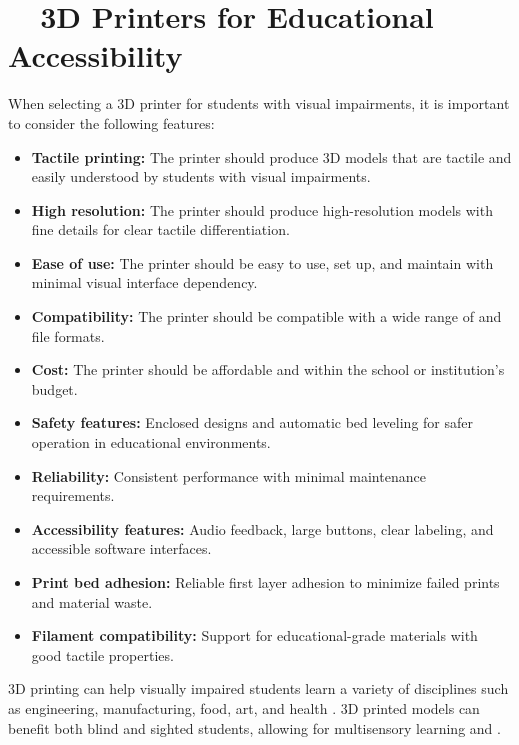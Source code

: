 \section{~~3D Printers for Educational Accessibility}\label{ch5:sec:3d-printers}
When selecting a 3D printer for students with visual impairments, it is important to consider the following features:
\begin{itemize}
	\item \textbf{Tactile printing:} The printer should produce 3D models that are tactile and easily understood by students with visual impairments.
	\item \textbf{High resolution:} The printer should produce high-resolution models with fine details for clear tactile differentiation.
	\item \textbf{Ease of use:} The printer should be easy to use, set up, and maintain with minimal visual interface dependency.
	\item \textbf{Compatibility:} The printer should be compatible with a wide range of  and file formats.
	\item \textbf{Cost:} The printer should be affordable and within the school or institution's budget.
	\item \textbf{Safety features:} Enclosed designs and automatic bed leveling for safer operation in educational environments.
	\item \textbf{Reliability:} Consistent performance with minimal maintenance requirements.
	\item \textbf{Accessibility features:} Audio feedback, large buttons, clear labeling, and accessible software interfaces.
	\item \textbf{Print bed adhesion:} Reliable first layer adhesion to minimize failed prints and material waste.
	\item \textbf{Filament compatibility:} Support for educational-grade materials with good tactile properties.
\end{itemize}

3D printing can help visually impaired students learn a variety of disciplines such as engineering, manufacturing, food, art, and health \supercite{Karbowski2020, TeachThought2021}. 3D printed models can benefit both blind and sighted students, allowing for multisensory learning and  \supercite{MatterHackers2017, DassaultEducation}.

